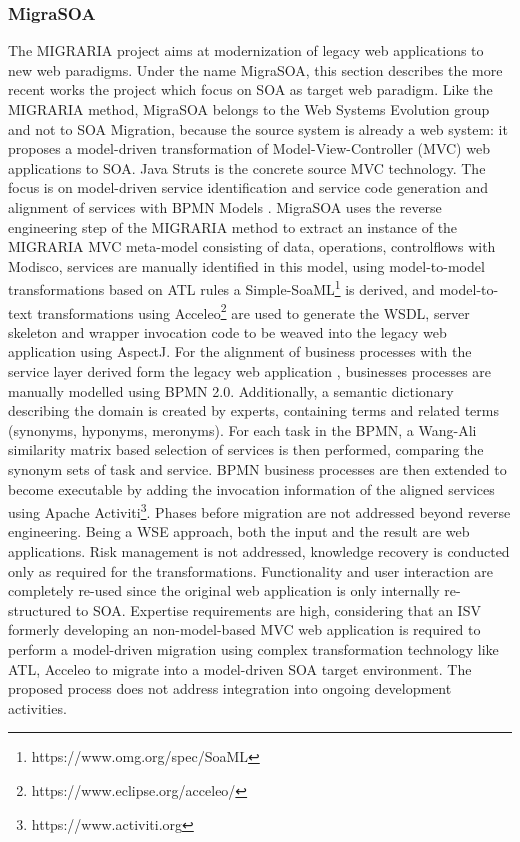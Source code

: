 \hypertarget{migrasoa}{%
\subsubsection{MigraSOA}\label{migrasoa}}

The MIGRARIA project aims at modernization of legacy web applications to new web paradigms.
Under the name MigraSOA, this section describes the more recent works the project \autocite{SosaSanchez2017MigraSOA,Sosa2014MigraSOA,Sosa2013MigraSOA} which focus on SOA as target web paradigm.
Like the MIGRARIA method, MigraSOA belongs to the Web Systems Evolution group and not to SOA Migration, because the source system is already a web system: it proposes a model-driven transformation of Model-View-Controller (MVC) web applications to SOA.
Java Struts is the concrete source MVC technology.
The focus is on model-driven service identification and service code generation \autocite{Sosa2013MigraSOA} and alignment of services with BPMN Models \autocite{Sosa2014MigraSOA}.
MigraSOA uses the reverse engineering step of the MIGRARIA method to extract an instance of the MIGRARIA MVC meta-model consisting of data, operations, controlflows with Modisco, services are manually identified in this model, using model-to-model transformations based on ATL rules a Simple-SoaML\footnote{https://www.omg.org/spec/SoaML} is derived, and model-to-text transformations using Acceleo\footnote{https://www.eclipse.org/acceleo/} are used to generate the WSDL, server skeleton and wrapper invocation code to be weaved into the legacy web application using AspectJ.
For the alignment of business processes with the service layer derived form the legacy web application \autocite{Sosa2014MigraSOA}, businesses processes are manually modelled using BPMN 2.0.
Additionally, a semantic dictionary describing the domain is created by experts, containing terms and related terms (synonyms, hyponyms, meronyms).
For each task in the BPMN, a Wang-Ali similarity matrix based selection of services is then performed, comparing the synonym sets of task and service.
BPMN business processes are then extended to become executable \autocite{SosaSanchez2017MigraSOA} by adding the invocation information of the aligned services using Apache Activiti\footnote{https://www.activiti.org}.
Phases before migration are not addressed beyond reverse engineering.
Being a WSE approach, both the input and the result are web applications.
Risk management is not addressed, knowledge recovery is conducted only as required for the transformations.
Functionality and user interaction are completely re-used since the original web application is only internally re-structured to SOA.
Expertise requirements are high, considering that an ISV formerly developing an non-model-based MVC web application is required to perform a model-driven migration using complex transformation technology like ATL, Acceleo to migrate into a model-driven SOA target environment.
The proposed process does not address integration into ongoing development activities.


